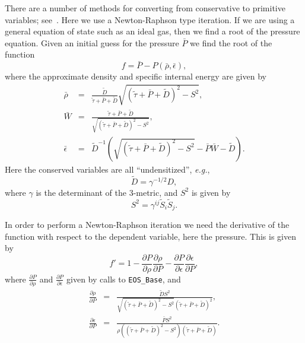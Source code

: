 \documentclass{article}
\begin{document}
There are a number of methods for converting from conservative to
primitive variables; see~\cite{livrevsrrfd}. Here we use a
Newton-Raphson type iteration. If we are using a general equation of
state such as an ideal gas, then we find a root of the pressure
equation. Given an initial guess for the pressure $\bar{P}$ we find
the root of the function
\begin{equation}
  \label{eq:pressure1}
  f = \bar{P} - P(\bar{\rho}, \bar{\epsilon}),
\end{equation}
where the approximate density and specific internal energy are given
by 
\begin{eqnarray}
  \label{eq:press1gives}
  \bar{\rho} & = & \frac{\tilde{D}}{\tilde{\tau} + \bar{P} + \tilde{D}}
  \sqrt{ (\tilde{\tau} + \bar{P} + \tilde{D})^2 - S^2 }, \\
  \bar{W} & = & \frac{\tilde{\tau} + \bar{P} + \tilde{D}}{\sqrt{
      (\tilde{\tau} + \bar{P} + \tilde{D})^2 - S^2 }}, \\
  \bar{\epsilon} & = & \tilde{D}^{-1} \left( \sqrt{ (\tilde{\tau} +
      \bar{P} + \tilde{D})^2 - S^2 } - \bar{P} \bar{W} - \tilde{D}
  \right). 
\end{eqnarray}
Here the conserved variables are all ``undensitized'', {\it e.g.},
\begin{equation}
  \label{eq:undens}
  \tilde{D} = \gamma^{-1/2} D,
\end{equation}
where $\gamma$ is the determinant of the 3-metric, and $S^2$ is given
by 
\begin{equation}
  \label{eq:s2}
  S^2 = \gamma^{ij}\tilde{S}_i\tilde{S}_j.
\end{equation}

In order to perform a Newton-Raphson iteration we need the derivative
of the function with respect to the dependent variable, here the
pressure. This is given by
\begin{equation}
  \label{eq:df}
  f' = 1 - \frac{\partial P}{\partial \rho}\frac{\partial
  \rho}{\partial P} - \frac{\partial P}{\partial
  \epsilon}\frac{\partial \epsilon}{\partial P}, 
\end{equation}
where $\frac{\partial P}{\partial \rho}$ and $\frac{\partial
  P}{\partial \epsilon}$ given by calls to {\tt EOS\_Base}, and
\begin{eqnarray}
  \label{eq:df2}
  \frac{\partial \rho}{\partial P} & = & \frac{\tilde{D}
      S^2}{\sqrt{(\tilde{\tau} + \bar{P} + \tilde{D})^2 -
      S^2}(\tilde{\tau} + \bar{P} + \tilde{D})^2}, \\
  \frac{\partial \epsilon}{\partial P} & = & \frac{\bar{P}
      S^2}{\rho\left((\tilde{\tau} + \bar{P} + \tilde{D})^2 -
      S^2\right)(\tilde{\tau} + \bar{P} + \tilde{D})}. \\
\end{eqnarray}
\end{document}
